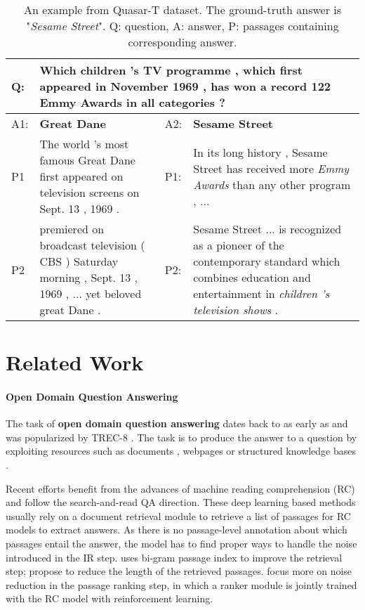 \documentclass{article} \usepackage{iclr2018_conference,times}
\begin{document}
\begin{table*}[]
\centering
\small
\begin{tabular}{lp{5.5cm}|lp{5.5cm}}
Q: & \multicolumn{3}{p{12cm}}{Which children 's TV programme , which first appeared in November 1969 , has won a record 122 Emmy Awards in all categories ?} \\
\hline
A1: & {\textbf{Great Dane}} & A2: & {\textbf{Sesame Street}}\\
P1 & {The world 's most famous Great Dane first appeared on television screens on Sept. 13 , 1969 .} & P1: & {In its long history , Sesame Street has received more \emph{Emmy Awards} than any other program , ...}                            \\
P2 & {premiered on broadcast television ( CBS ) Saturday morning , Sept. 13 , 1969 , ... yet beloved great Dane .}    & P2: & {Sesame Street ... is recognized as a pioneer of the contemporary standard which combines education and entertainment in \emph{children 's television shows} .}                                 \\
\end{tabular}
\normalsize
\caption{An example from Quasar-T dataset. The ground-truth answer is "\emph{Sesame Street}". Q: question, A: answer, P: passages containing corresponding answer.}
\label{example_triviaqa}
\end{table*}

 \section{Related Work}

\paragraph{Open Domain Question Answering}
The task of \textbf{open domain question answering} dates back to as early as \citep{green1961baseball} and was popularized by TREC-8 \citep{voorhees1999trec}. The task is to produce the answer to a question by exploiting resources such as documents \citep{voorhees1999trec}, webpages \citep{kwok2001scaling} or structured knowledge bases \citep{berant2013semantic,bordes2015large,yu2017improved}.

Recent efforts \citep{chen2017reading,dunn2017searchqa,dhingra2017quasar,wang2017r} benefit from the advances of machine reading comprehension (RC) and follow the search-and-read QA direction.
These deep learning based methods usually rely on a document retrieval module to retrieve a list of passages for RC models to extract answers. As there is no passage-level annotation about which passages entail the answer, the model has to find proper ways to handle the noise introduced in the IR step. \citet{chen2017reading} uses bi-gram passage index to improve the retrieval step; \citet{dunn2017searchqa,dhingra2017quasar} propose to reduce the length of the retrieved passages. \cite{wang2017r} focus more on noise reduction in the passage ranking step, in which a ranker module is jointly trained with the RC model with reinforcement learning.
\end{document}
